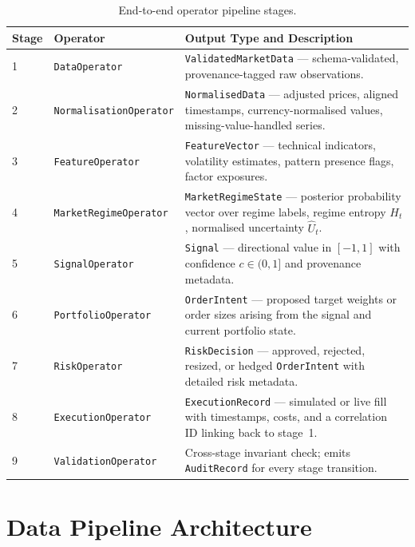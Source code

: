 \documentclass[12pt,openany]{book}
\numberwithin{equation}{chapter}
\theoremstyle{plain}
\theoremstyle{definition}
\theoremstyle{remark}
\begin{document}
\begin{table}[H]
\centering
\caption{End-to-end operator pipeline stages.}
\label{tab:pipeline_stages}
\small
\begin{tabularx}{\textwidth}{p{1.5cm} p{3.8cm} p{10.0cm}}
\toprule
\textbf{Stage} & \textbf{Operator} & \textbf{Output Type and Description} \\
\midrule
1 & \texttt{DataOperator} &
    \texttt{ValidatedMarketData} --- schema-validated, provenance-tagged
    raw observations. \\
\midrule
2 & \texttt{NormalisationOperator} &
    \texttt{NormalisedData} --- adjusted prices, aligned timestamps,
    currency-normalised values, missing-value-handled series. \\
\midrule
3 & \texttt{FeatureOperator} &
    \texttt{FeatureVector} --- technical indicators, volatility estimates,
    pattern presence flags, factor exposures. \\
\midrule
4 & \texttt{MarketRegimeOperator} &
    \texttt{MarketRegimeState} --- posterior probability vector over
    regime labels, regime entropy $H_t$, normalised uncertainty $\hat{U}_t$. \\
\midrule
5 & \texttt{SignalOperator} &
    \texttt{Signal} --- directional value in $[-1, 1]$ with confidence
    $c \in (0, 1]$ and provenance metadata. \\
\midrule
6 & \texttt{PortfolioOperator} &
    \texttt{OrderIntent} --- proposed target weights or order sizes
    arising from the signal and current portfolio state. \\
\midrule
7 & \texttt{RiskOperator} &
    \texttt{RiskDecision} --- approved, rejected, resized, or hedged
    \texttt{OrderIntent} with detailed risk metadata. \\
\midrule
8 & \texttt{ExecutionOperator} &
    \texttt{ExecutionRecord} --- simulated or live fill with timestamps,
    costs, and a correlation ID linking back to stage~1. \\
\midrule
9 & \texttt{ValidationOperator} &
    Cross-stage invariant check; emits \texttt{AuditRecord} for every
    stage transition. \\
\bottomrule
\end{tabularx}
\end{table}

\chapter{Data Pipeline Architecture}
\end{document}
